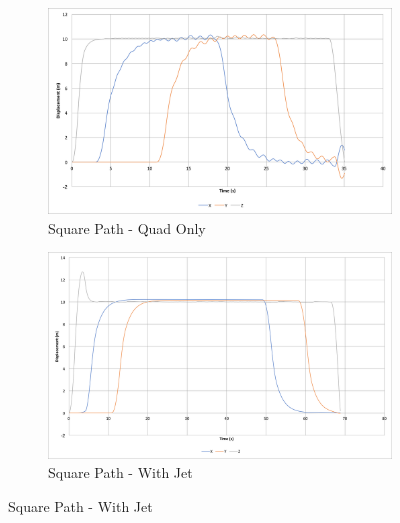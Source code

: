 \documentclass[10pt]{article}
\begin{document}
\begin{figure}[p]
    \centering
    \begin{subfigure}{0.72\textwidth}
        \includegraphics[width=\textwidth]{square_path_quad_only}
        \caption{Square Path - Quad Only}
        \label{fig:square_path_quad_only}
    \end{subfigure}

    \begin{subfigure}{0.72\textwidth}
        \includegraphics[width=\textwidth]{square_path_w_jet}
        \caption{Square Path - With Jet}
        \label{fig:square_path_w_jet}
    \end{subfigure}


\end{figure}
\end{document}
